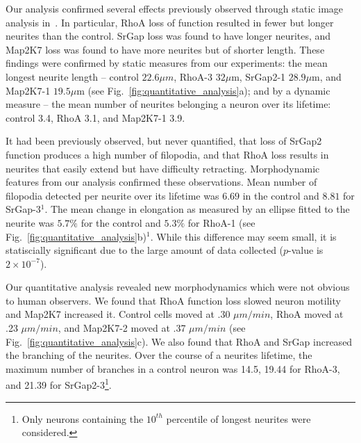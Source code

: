 Our analysis confirmed several effects previously observed through static image
analysis  in~\cite{Pertz08}.  In  particular,  RhoA  loss  of  function
resulted in fewer but longer neurites than the control. SrGap loss was
found to have longer neurites, and  Map2K7 loss was found to have
more neurites but of shorter length.  These findings  were confirmed by 
static measures from
our experiments: the mean longest  neurite length -- control $22.6 \mu
m$, RhoA-3 $32  \mu$m, SrGap2-1 $28.9 \mu$m,  and Map2K7-1 $19.5 \mu$m  
(see  Fig.~\ref{fig:quantitative_analysis}a);  and  by  a  dynamic
measure --  the mean  number of neurites  belonging a neuron  over its
lifetime: control 3.4, RhoA 3.1, and Map2K7-1 3.9.

It  had been previously observed, but  never quantified,  that  loss of
SrGap2 function  produces a  high number of  filopodia, and  that RhoA
loss  results  in neurites  that  easily  extend  but have  difficulty
retracting. Morphodynamic features from our analysis confirmed these
observations. Mean number of filopodia detected per  neurite over its lifetime was $6.69$
in the control  and $8.81$ for SrGap-3$^1$. The  mean change in elongation
as measured  by an ellipse fitted  to the neurite was  $5.7\%$ for the
control        and        $5.3\%$        for        RhoA-1        (see
Fig.~\ref{fig:quantitative_analysis}b)$^1$. While this difference may seem
small,  it is  statiscially significant due  to the  large amount  of  data collected
($p$-value is $2 \times 10^{-7}$).

Our quantitative analysis revealed new morphodynamics which
were not obvious to human  observers. We found that RhoA function loss
slowed  neuron motility and  Map2K7 increased  it.  Control cells
moved at  .30 $\mu  m / min$,  RhoA moved  at .23 $\mu  m /  min$, and
Map2K7-2     moved     at    .37     $\mu     m     /    min$     (see
Fig.~\ref{fig:quantitative_analysis}c).  We  also found that  RhoA and
SrGap  increased the  branching of  the
neurites.
Over the course
of a  neurites lifetime, the maximum  number of branches  in a control
neuron    was    14.5,   19.44    for    RhoA-3,    and   21.39    for
SrGap2-3\footnote{Only neurons containing  the  $10^{th}$  percentile  of
  longest neurites were considered.}.





